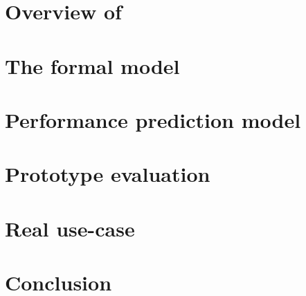 \documentclass[5p]{elsarticle}
\begin{document}
\section{Overview of \mad}
\label{sec:mad_model}


\section{The \mad formal model}
\label{sec:formal_model}


\section{Performance prediction model}
\label{sec:perf_model}


\section{Prototype evaluation}
\label{sec:evaluations}


\section{Real use-case}
\label{sec:use-cases}


\section{Conclusion}
\label{sec:conc}






%  

\end{document}
